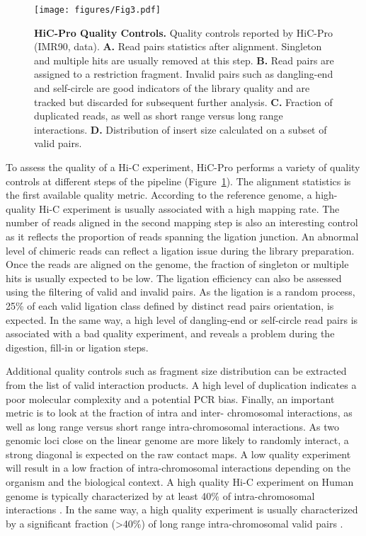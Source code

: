 \begin{figure}
\texttt{[image: figures/Fig3.pdf]}
\caption{\textbf{HiC-Pro Quality Controls.} Quality controls reported by HiC-Pro
(IMR90, \citet{dixon:topological} data). \textbf{A.} Read pairs statistics
after alignment. Singleton and multiple hits are usually removed at this step.
\textbf{B.} Read pairs are assigned to a restriction fragment. Invalid pairs
such as dangling-end and self-circle are good indicators of the library
quality and are tracked but discarded for subsequent further analysis.
\textbf{C.} Fraction of duplicated reads, as well as short range versus long
range interactions. \textbf{D.} Distribution of insert size calculated on a
subset of valid pairs.}
\label{fig:fig3}
\end{figure}


To assess the quality of a Hi-C experiment, HiC-Pro performs a variety of
quality controls at different steps of the pipeline (Figure~\ref{fig:fig3}).
The alignment statistics is the first available quality metric. According to
the reference genome, a high-quality Hi-C experiment is usually associated
with a high mapping rate. The number of reads aligned in the second mapping
step is also an interesting control as it reflects the proportion of reads
spanning the ligation junction. An abnormal level of chimeric reads can
reflect a ligation issue during the library preparation. Once the reads are
aligned on the genome, the fraction of singleton or multiple hits is usually
expected to be low. The ligation efficiency can also be assessed using the
filtering of valid and invalid pairs. As the ligation is a random process,
25\% of each valid ligation class defined by distinct read pairs orientation,
is expected. In the same way, a high level of dangling-end or self-circle read
pairs is associated with a bad quality experiment, and reveals a problem
during the digestion, fill-in or ligation steps.

Additional quality controls such as fragment size distribution can be
extracted from the list of valid interaction products. A high level of
duplication indicates a poor molecular complexity and a potential PCR bias.
Finally, an important metric is to look at the fraction of intra and inter-
chromosomal interactions, as well as long range versus short range
intra-chromosomal interactions. As two genomic loci close on the linear genome
are more likely to randomly interact, a strong diagonal is expected on the raw
contact maps. A low quality experiment will result in a low fraction of
intra-chromosomal interactions depending on the organism and the biological
context. A high quality Hi-C experiment on Human genome is typically
characterized by at least 40\% of intra-chromosomal interactions
\citep{lajoie:hitchhiker}. In the
same way, a high quality experiment is usually characterized by a significant
fraction (>40\%) of long range intra-chromosomal valid pairs \citep{rao:3d}.

